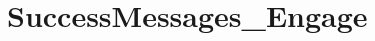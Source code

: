 \hypertarget{group___success_messages___engage}{
\section{SuccessMessages\_\-Engage}
\label{group___success_messages___engage}
}
